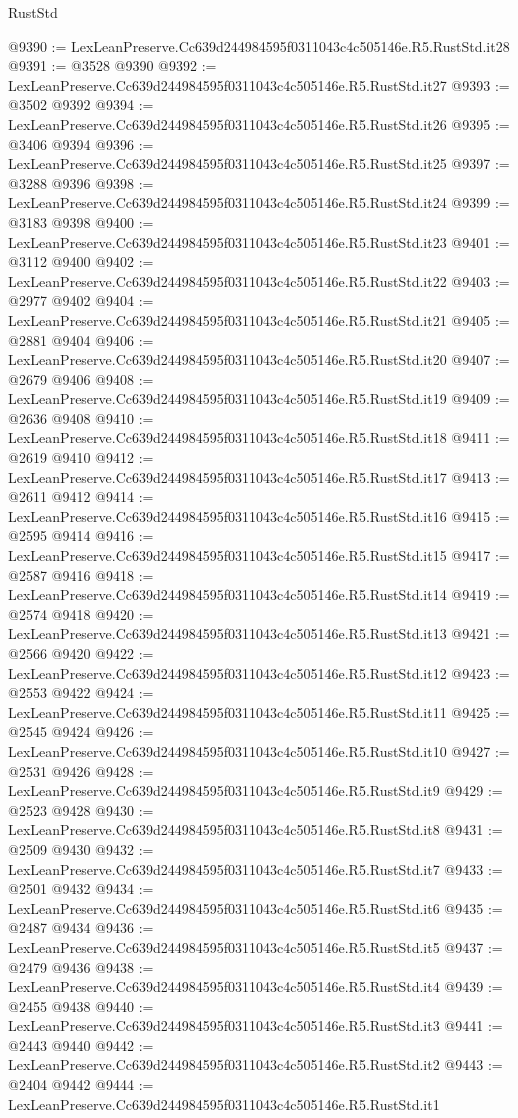 \begin{lexlean}{RustStd}
\begin{coremodule}
@9390 := LexLeanPreserve.Cc639d244984595f0311043c4c505146e.R5.RustStd.it28
@9391 := @3528 @9390
@9392 := LexLeanPreserve.Cc639d244984595f0311043c4c505146e.R5.RustStd.it27
@9393 := @3502 @9392
@9394 := LexLeanPreserve.Cc639d244984595f0311043c4c505146e.R5.RustStd.it26
@9395 := @3406 @9394
@9396 := LexLeanPreserve.Cc639d244984595f0311043c4c505146e.R5.RustStd.it25
@9397 := @3288 @9396
@9398 := LexLeanPreserve.Cc639d244984595f0311043c4c505146e.R5.RustStd.it24
@9399 := @3183 @9398
@9400 := LexLeanPreserve.Cc639d244984595f0311043c4c505146e.R5.RustStd.it23
@9401 := @3112 @9400
@9402 := LexLeanPreserve.Cc639d244984595f0311043c4c505146e.R5.RustStd.it22
@9403 := @2977 @9402
@9404 := LexLeanPreserve.Cc639d244984595f0311043c4c505146e.R5.RustStd.it21
@9405 := @2881 @9404
@9406 := LexLeanPreserve.Cc639d244984595f0311043c4c505146e.R5.RustStd.it20
@9407 := @2679 @9406
@9408 := LexLeanPreserve.Cc639d244984595f0311043c4c505146e.R5.RustStd.it19
@9409 := @2636 @9408
@9410 := LexLeanPreserve.Cc639d244984595f0311043c4c505146e.R5.RustStd.it18
@9411 := @2619 @9410
@9412 := LexLeanPreserve.Cc639d244984595f0311043c4c505146e.R5.RustStd.it17
@9413 := @2611 @9412
@9414 := LexLeanPreserve.Cc639d244984595f0311043c4c505146e.R5.RustStd.it16
@9415 := @2595 @9414
@9416 := LexLeanPreserve.Cc639d244984595f0311043c4c505146e.R5.RustStd.it15
@9417 := @2587 @9416
@9418 := LexLeanPreserve.Cc639d244984595f0311043c4c505146e.R5.RustStd.it14
@9419 := @2574 @9418
@9420 := LexLeanPreserve.Cc639d244984595f0311043c4c505146e.R5.RustStd.it13
@9421 := @2566 @9420
@9422 := LexLeanPreserve.Cc639d244984595f0311043c4c505146e.R5.RustStd.it12
@9423 := @2553 @9422
@9424 := LexLeanPreserve.Cc639d244984595f0311043c4c505146e.R5.RustStd.it11
@9425 := @2545 @9424
@9426 := LexLeanPreserve.Cc639d244984595f0311043c4c505146e.R5.RustStd.it10
@9427 := @2531 @9426
@9428 := LexLeanPreserve.Cc639d244984595f0311043c4c505146e.R5.RustStd.it9
@9429 := @2523 @9428
@9430 := LexLeanPreserve.Cc639d244984595f0311043c4c505146e.R5.RustStd.it8
@9431 := @2509 @9430
@9432 := LexLeanPreserve.Cc639d244984595f0311043c4c505146e.R5.RustStd.it7
@9433 := @2501 @9432
@9434 := LexLeanPreserve.Cc639d244984595f0311043c4c505146e.R5.RustStd.it6
@9435 := @2487 @9434
@9436 := LexLeanPreserve.Cc639d244984595f0311043c4c505146e.R5.RustStd.it5
@9437 := @2479 @9436
@9438 := LexLeanPreserve.Cc639d244984595f0311043c4c505146e.R5.RustStd.it4
@9439 := @2455 @9438
@9440 := LexLeanPreserve.Cc639d244984595f0311043c4c505146e.R5.RustStd.it3
@9441 := @2443 @9440
@9442 := LexLeanPreserve.Cc639d244984595f0311043c4c505146e.R5.RustStd.it2
@9443 := @2404 @9442
@9444 := LexLeanPreserve.Cc639d244984595f0311043c4c505146e.R5.RustStd.it1

\end{coremodule}
\end{lexlean}
